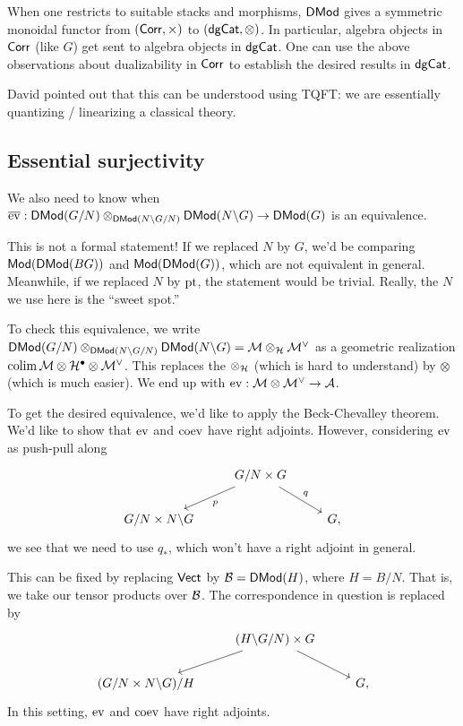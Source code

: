 \documentclass{article}
\begin{document}
When one restricts to suitable stacks and morphisms, $\mathsf{DMod}$ gives a symmetric monoidal functor from $(\mathsf{Corr}, \times)$ to $(\mathsf{dgCat}, \otimes)$.
In particular, algebra objects in $\mathsf{Corr}$ (like $G$) get sent to algebra objects in $\mathsf{dgCat}$.
One can use the above observations about dualizability in $\mathsf{Corr}$ to establish the desired results in $\mathsf{dgCat}$.

\begin{rmk}
	David pointed out that this can be understood using TQFT: we are essentially quantizing / linearizing a classical theory.
\end{rmk}

\subsection{Essential surjectivity}

We also need to know when $\overline{\operatorname{ev}}: \mathsf{DMod}(G / N) \otimes_{\mathsf{DMod}(N \backslash G / N)} \mathsf{DMod}(N \backslash G) \to \mathsf{DMod}(G)$ is an equivalence.

\begin{rmk}
	This is not a formal statement!
	If we replaced $N$ by $G$, we'd be comparing $\mathsf{Mod}(\mathsf{DMod}(BG))$ and $\mathsf{Mod}(\mathsf{DMod}(G))$, which are not equivalent in general.
	Meanwhile, if we replaced $N$ by $\operatorname{pt}$, the statement would be trivial.
	Really, the $N$ we use here is the ``sweet spot.''
\end{rmk}

To check this equivalence, we write $\mathsf{DMod}(G / N) \otimes_{\mathsf{DMod}(N \backslash G / N)} \mathsf{DMod}(N \backslash G) = \mathcal{M} \otimes_{\mathcal{H}} \mathcal{M}^\vee$ as a geometric realization $\operatorname{colim} \mathcal{M} \otimes \mathcal{H}^{\bullet} \otimes \mathcal{M}^\vee$.
This replaces the $\otimes_{\mathcal{H}}$ (which is hard to understand) by $\otimes$ (which is much easier).
We end up with $\operatorname{ev}: \mathcal{M} \otimes \mathcal{M}^\vee \to \mathcal{A}$.

To get the desired equivalence, we'd like to apply the Beck-Chevalley theorem.
We'd like to show that $\operatorname{ev}$ and $\operatorname{coev}$ have right adjoints.
However, considering $\operatorname{ev}$ as push-pull along
\[
	\begin{tikzcd}
		& \ar[dl, "p"] G / N \times G \ar[dr, "q"] & \\
		G / N \times N \bs G & & G,
	\end{tikzcd}
\]
we see that we need to use $q_*$, which won't have a right adjoint in general.

This can be fixed by replacing $\mathsf{Vect}$ by $\mathcal{B} = \mathsf{DMod}(H)$, where $H = B / N$.
That is, we take our tensor products over $\mathcal{B}$.
The correspondence in question is replaced by
\[
	\begin{tikzcd}
		& \ar[dl] (H \bs G / N) \times G \ar[dr] & \\
		(G / N \times N \bs G) / H & & G,
	\end{tikzcd}
\]
In this setting, $\operatorname{ev}$ and $\operatorname{coev}$ have right adjoints.
\end{document}

